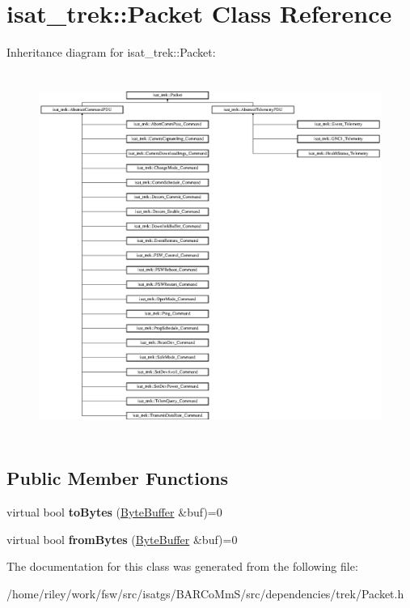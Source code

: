 \hypertarget{classisat__trek_1_1_packet}{}\section{isat\+\_\+trek\+:\+:Packet Class Reference}
\label{classisat__trek_1_1_packet}
Inheritance diagram for isat\+\_\+trek\+:\+:Packet\+:\begin{figure}[H]
\begin{center}
\leavevmode
\includegraphics[height=12.000000cm]{classisat__trek_1_1_packet}
\end{center}
\end{figure}
\subsection*{Public Member Functions}
\begin{DoxyCompactItemize}
\item 
virtual bool {\bfseries to\+Bytes} (\hyperlink{classisat__utils_1_1_byte_buffer}{Byte\+Buffer} \&buf)=0\hypertarget{classisat__trek_1_1_packet_a51c8893a9eaf7e234474f9555d0af87c}{}\label{classisat__trek_1_1_packet_a51c8893a9eaf7e234474f9555d0af87c}

\item 
virtual bool {\bfseries from\+Bytes} (\hyperlink{classisat__utils_1_1_byte_buffer}{Byte\+Buffer} \&buf)=0\hypertarget{classisat__trek_1_1_packet_abc0b9e0fc84e4cc2e49fcf262f50ee2e}{}\label{classisat__trek_1_1_packet_abc0b9e0fc84e4cc2e49fcf262f50ee2e}

\end{DoxyCompactItemize}


The documentation for this class was generated from the following file\+:\begin{DoxyCompactItemize}
\item 
/home/riley/work/fsw/src/isatgs/\+B\+A\+R\+Co\+Mm\+S/src/dependencies/trek/Packet.\+h\end{DoxyCompactItemize}
